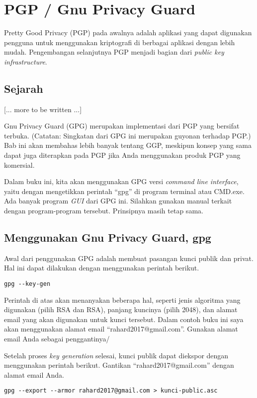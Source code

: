 \chapter{PGP / Gnu Privacy Guard}
Pretty Good Privacy (PGP) pada awalnya adalah aplikasi yang dapat digunakan
pengguna untuk menggunakan kriptografi di berbagai aplikasi dengan lebih mudah.
Pengembangan selanjutnya PGP menjadi bagian dari {\em public key
infrastructure}.

\section{Sejarah}
[... more to be written ...]

Gnu Privacy Guard (GPG) merupakan implementasi dari PGP yang bersifat terbuka.
(Catatan: Singkatan dari GPG ini merupakan guyonan terhadap PGP.) Bab ini akan
membahas lebih banyak tentang GGP, meskipun konsep yang sama dapat juga
diterapkan pada PGP jika Anda menggunakan produk PGP yang komersial.

Dalam buku ini, kita akan menggunakan GPG versi {\em command line interface},
yaitu dengan mengetikkan perintah ``gpg'' di program terminal atau CMD.exe.
Ada banyak program {\em GUI} dari GPG ini. Silahkan gunakan manual terkait
dengan program-program tersebut. Prinsipnya masih tetap sama.

\section{Menggunakan Gnu Privacy Guard, gpg}
Awal dari penggunakan GPG adalah membuat pasangan kunci publik dan privat. Hal
ini dapat dilakukan dengan menggunakan perintah berikut.

\begin{verbatim}
gpg --key-gen
\end{verbatim}

Perintah di atas akan menanyakan beberapa hal, seperti jenis algoritma yang
digunakan (pilih RSA dan RSA), panjang kuncinya (pilih 2048), dan alamat email
yang akan digunakan untuk kunci tersebut. Dalam contoh buku ini saya akan
menggunakan alamat email ``rahard2017@gmail.com''. Gunakan alamat email Anda
sebagai penggantinya/

Setelah proses {\em key generation} selesai, kunci publik dapat diekspor dengan
menggunakan perintah  berikut. Gantikan ``rahard2017@gmail.com'' dengan alamat
email Anda.

\begin{verbatim}
gpg --export --armor rahard2017@gmail.com > kunci-public.asc
\end{verbatim}

